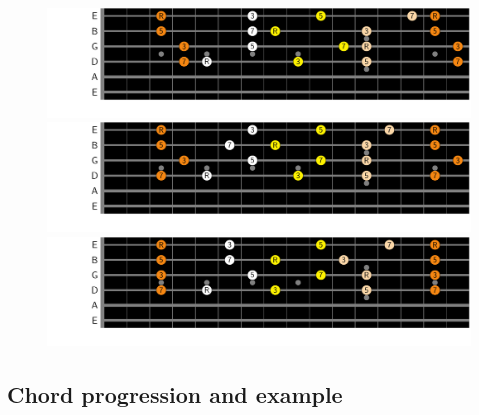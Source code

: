 \documentclass{article}
\begin{document}
\begin{figure}[h!]
	\centering
	\hspace*{-2.2cm}
	\includegraphics[scale=0.7, trim= {0cm 0cm 0cm 0cm}, clip]{figures/chord-inversions/maj7.pdf}
	\hspace*{-2.2cm}
	\includegraphics[scale=0.7, trim= {0cm 0cm 0cm 0cm}, clip]{figures/chord-inversions/Dominant7.pdf}
	\hspace*{-2.2cm}
	\includegraphics[scale=0.7, trim= {0cm 0cm 0cm 0cm}, clip]{figures/chord-inversions/m7.pdf}
	\caption{ }
	\label{fig}
\end{figure}

\newpage
\subsection{Chord progression and example}


\end{document}
